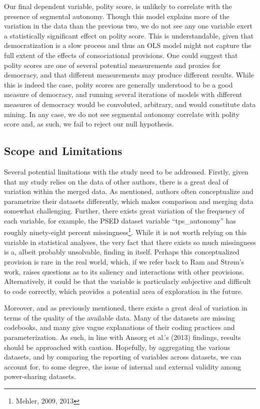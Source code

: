\documentclass[12pt]{article}
\begin{document}
Our final dependent variable, polity score, is unlikely to correlate with the presence of segmental autonomy. Though this model explains more of the variation in the data than the previous two, we do not see any one variable exert a statistically significant effect on polity score. This is understandable, given that democratization is a slow process and thus an OLS model might not capture the full extent of the effects of consociational provisions. One could suggest that polity scores are one of several potential measurements and proxies for democracy, and that different measurements may produce different results. While this is indeed the case, polity scores are generally understood to be a good measure of democracy, and running several iterations of models with different measures of democracy would be convoluted, arbitrary, and would constitute data mining. In any case, we do not see segmental autonomy correlate with polity score and, as such, we fail to reject our null hypothesis.
 
\subsection{Scope and Limitations}
Several potential limitations with the study need to be addressed. Firstly, given that my study relies on the data of other authors, there is a great deal of variation within the merged data. As mentioned, authors often conceptualize and parametrize their datasets differently, which makes comparison and merging data somewhat challenging. Further, there exists great variation of the frequency of each variable, for example, the PSED dataset variable “tps\_autonomy” has roughly ninety-eight percent missingness\footnote{Mehler, 2009, 2013}. While it is not worth relying on this variable in statistical analyses, the very fact that there exists so much missingness is a, albeit probably unsolvable, finding in itself. Perhaps this conceptualized provision is rare in the real world, which, if we refer back to Ram and Strøm’s work, raises questions as to its saliency and interactions with other provisions. Alternatively, it could be that the variable is particularly subjective and difficult to code correctly, which provides a potential area of exploration in the future. 

Moreover, and as previously mentioned, there exists a great deal of variation in terms of the quality of the available data. Many of the datasets are missing codebooks, and many give vague explanations of their coding practices and parameterization. As such, in line with Ansorg et al.’s (2013) findings, results should be approached with caution. Hopefully, by aggregating the various datasets, and by comparing the reporting of variables across datasets, we can account for, to some degree, the issue of internal and external validity among power-sharing datasets.
\end{document}
